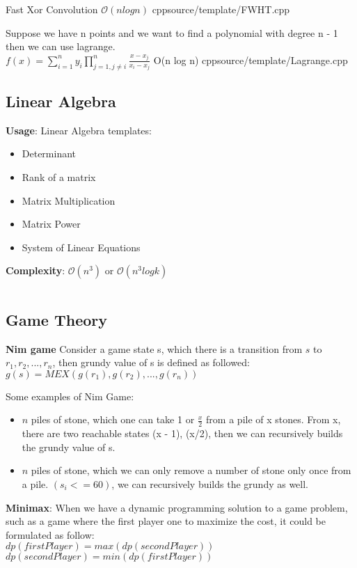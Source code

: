{Fast Xor Convolution}
{$\mathcal{O}(n log n)$}
{cpp}{source/template/FWHT.cpp}

{Suppose we have n points and we want to find a polynomial with degree n - 1 then we can use lagrange. \\
$f(x)=\sum_{i=1}^n y_i \prod_{j=1,j\neq i}^n \frac{x-x_j}{x_i-x_j}$
}
{O(n log n)}
{cpp}{source/template/Lagrange.cpp}

\subsection{Linear Algebra}

{\textbf{Usage}: Linear Algebra templates:
\begin{itemize}
    \item Determinant
    \item Rank of a matrix
    \item Matrix Multiplication
    \item Matrix Power
    \item System of Linear Equations
\end{itemize}
}
{\textbf{Complexity}: $\mathcal{O}(n^3)$ or $\mathcal{O}(n^3 log k)$}
\inputminted[]{cpp}{source/template/Linalg.cpp}

\subsection{Game Theory}

\textbf{Nim game}
Consider a game state s, which there is a transition from $s$ to $r_1, r_2,..., r_n$, then
grundy value of s is defined as followed: \\
$g(s) = MEX(g(r_1), g(r_2),..., g(r_n))$

Some examples of Nim Game:
\begin{itemize}
\item $n$ piles of stone, which one can take 1 or $\frac{x}{2}$ from a pile of x stones. From x, there are two reachable states (x - 1), (x/2), then we can recursively builds the grundy value of s.
\item $n$ piles of stone, which we can only remove a number of stone only once from a pile. $(s_i <= 60)$, we can recursively builds the grundy as well.
\end{itemize}

\textbf{Minimax}:
When we have a dynamic programming solution to a game problem, such as a game where the first player one to maximize the cost, it could be formulated as follow: \\
$dp(firstPlayer) = max(dp(secondPlayer))$ \\
$dp(secondPlayer) = min(dp(firstPlayer))$
